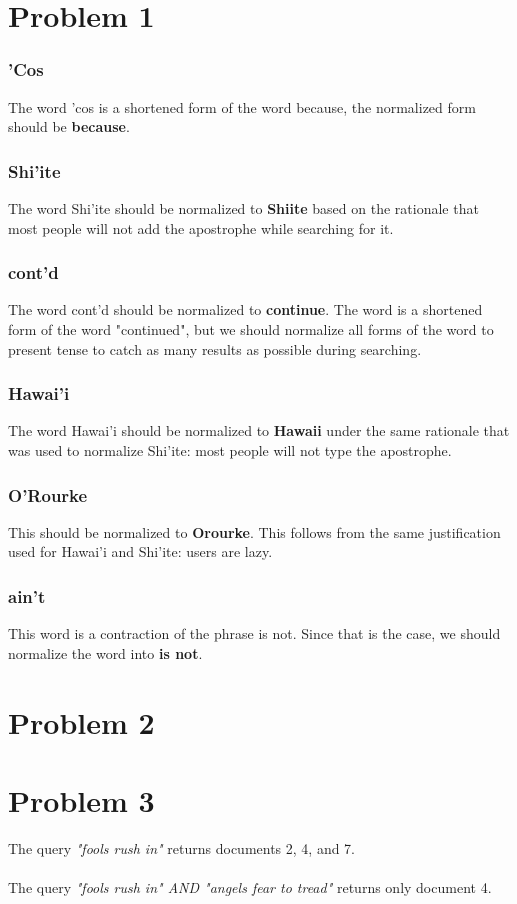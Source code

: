 \documentclass{article}%
\begin{document}
\section*{Problem 1}
\subsubsection*{'Cos}
The word 'cos is a shortened form of the word because, the normalized form should be \textbf{because}.
\subsubsection*{Shi'ite}
The word Shi'ite should be normalized to \textbf{Shiite} based on the rationale that most people will not add the apostrophe while searching for it.
\subsubsection*{cont'd}
The word cont'd should be normalized to \textbf{continue}. The word is a shortened form of the word "continued", but we should normalize all forms of the word to present tense to catch as many results as possible during searching.
\subsubsection*{Hawai'i}
The word Hawai'i should be normalized to \textbf{Hawaii} under the same rationale that was used to normalize Shi'ite: most people will not type the apostrophe.
\subsubsection*{O'Rourke}
This should be normalized to \textbf{Orourke}. This follows from the same justification used for Hawai'i and Shi'ite: users are lazy.
\subsubsection*{ain't}
This word is a contraction of the phrase is not. Since that is the case, we should normalize the word into \textbf{is not}.
\section*{Problem 2}
\section*{Problem 3}
The query \textit{"fools rush in"} returns documents 2, 4, and 7.\\
\\
The query \textit{"fools rush in" AND "angels fear to tread"} returns only document 4.
\end{document}
